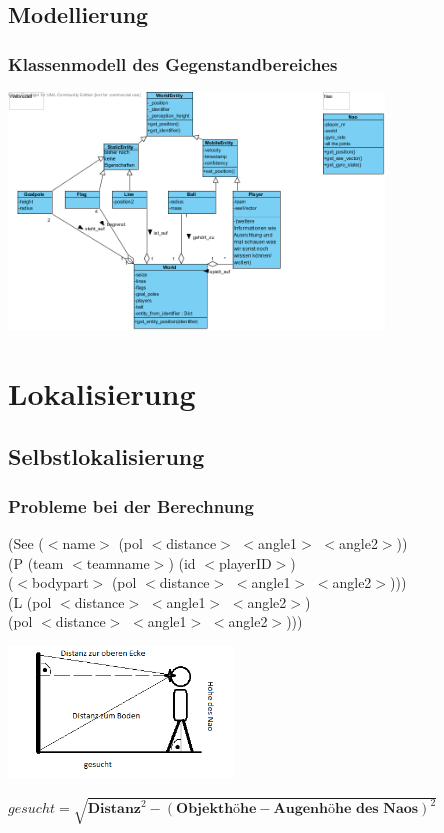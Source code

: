 \subsection{Modellierung}
\frame
{\frametitle{Klassenmodell des Gegenstandbereiches}
\begin{center}\includegraphics[height=6.3cm, center]{Weltenmodell.png}\end{center}
}

\section{Lokalisierung}

\subsection{Selbstlokalisierung}
\frame
{\frametitle{Probleme bei der Berechnung}
(See ($<$name$>$ (pol $<$distance$>$ $<$angle1$>$ $<$angle2$>$))\\
\hspace*{8mm}(P (team $<$teamname$>$) (id $<$playerID$>$)\\
\hspace*{13mm}($<$bodypart$>$ (pol $<$distance$>$ $<$angle1$>$ $<$angle2$>$)))\\
\hspace*{8mm}(L (pol $<$distance$>$ $<$angle1$>$ $<$angle2$>$) \\
\hspace*{13mm}(pol $<$distance$>$ $<$angle1$>$ $<$angle2$>$)))
\begin{center}\includegraphics[height=3.5cm, center]{Distanz_3D_Kugelkoordinaten_zu_2D_kartesisch.png}\end{center}
$gesucht = \sqrt{\textbf{Distanz}^2 - (\textbf{Objekthöhe} - \textbf{Augenhöhe des Naos})^2}$
}

